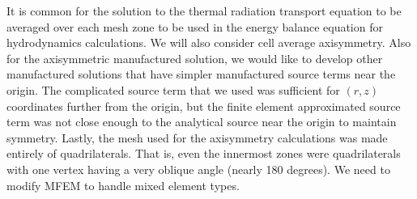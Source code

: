 \documentclass[12pt]{article}
\begin{document}
It is common for the solution to the thermal radiation transport equation to be averaged over each mesh zone to be used in the energy balance equation for hydrodynamics calculations. We will also consider cell average axisymmetry. Also for the axisymmetric manufactured solution, we would like to develop other manufactured solutions that have simpler manufactured source terms near the origin. The complicated source term that we used was sufficient for $(r,z)$ coordinates further from the origin, but the finite element approximated source term was not close enough to the analytical source near the origin to maintain symmetry. Lastly, the mesh used for the axisymmetry calculations was made entirely of quadrilaterals. That is, even the innermost zones were quadrilaterals with one vertex having a very oblique angle (nearly 180 degrees). We need to modify MFEM to handle mixed element types.



%
%
\end{document}
